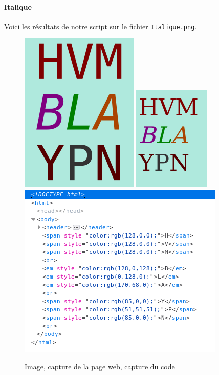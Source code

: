 \documentclass[a4paper,12pt,titlepage]{report}
\begin{document}
	\paragraph{Italique}
	Voici les résultats de notre script sur le fichier \texttt{Italique.png}.
	\begin{figure}[h]
	\centering
		\includegraphics[height=0.25\textwidth]{../illus/Italique.png}
		\includegraphics[height=0.25\textwidth]{../illus/ItaliqueR.png}
		\includegraphics[height=0.25\textwidth]{../illus/ItaliqueC.png}
		\caption{Image, capture de la page web, capture du code}
	\end{figure}
\end{document}
